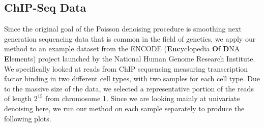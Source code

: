 \documentclass[12pt]{article}
\begin{document}
\subsection{ChIP-Seq Data}
Since the original goal of the Poisson denoising procedure is smoothing next generation sequencing data that is common in the field of genetics, we apply our method to an example dataset from the ENCODE (\textbf{Enc}yclopedia \textbf{O}f \textbf{D}NA \textbf{E}lements) project launched by the National Human Genome Research Institute. We specifically looked at reads from ChIP sequencing measuring transcription factor binding in two different cell types, with two samples for each cell type. Due to the massive size of the data, we selected a representative portion of the reads of length $2^{15}$ from chromosome 1. Since we are looking mainly at univariate denoising here, we run our method on each sample separately to produce the following plots.
\end{document}
